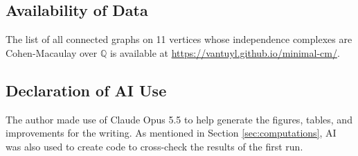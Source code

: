 \documentclass[10pt,a4paper]{amsart}
\theoremstyle{plain}
\theoremstyle{definition}
\theoremstyle{remark}
\numberwithin{equation}{section}
\numberwithin{equation}{section}
\begin{document}
\subsection*{Availability of Data} 
The list of all connected graphs on 11 vertices whose independence complexes are Cohen-Macaulay over $\mathbb{Q}$ is available at \url{https://vantuyl.github.io/minimal-cm/}.

\subsection*{Declaration of AI Use}  The author made use of Claude Opus 5.5
to help generate the figures, tables, and improvements for the writing.  As mentioned in
Section \ref{sec:computations}, AI was also used to create code to 
cross-check the results of the first run.  

\end{document}
